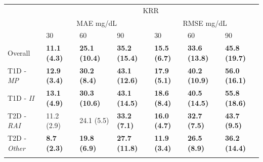 \begin{table}[b!]
\begin{tabular}{lllllll}
			& \multicolumn{6}{c}{KRR}       \\ \cline{2-7}
			\multicolumn{1}{l|}{}                           & \multicolumn{3}{c|}{MAE mg/dL}          & \multicolumn{3}{c|}{RMSE mg/dL} \\ \cline{2-7}
			\multicolumn{1}{l|}{}                           & 30 & 60 & \multicolumn{1}{l|}{90} & 30 & 60 & \multicolumn{1}{l|}{90}  \\ \hline
			\multicolumn{1}{l|}{Overall}                    & {\bf 11.1 (4.3)} & {\bf 25.1 (10.4)} & \multicolumn{1}{l|}{{\bf 35.2 (15.4)}} & {\bf 15.5 (6.7)} & {\bf 33.6 (13.8)} & \multicolumn{1}{l|}{{\bf 45.8 (19.7)}} \\
			\multicolumn{1}{l|}{T1D - {\sl MP}}   & {\bf12.9 (3.4)} & {\bf 30.2 (8.4)} & \multicolumn{1}{l|}{{\bf 43.1 (12.6)}} & {\bf17.9 (5.1)} & {\bf 40.2 (10.9)} & \multicolumn{1}{l|}{{\bf 56.0 (16.1)}}  \\
			\multicolumn{1}{l|}{T1D - {\sl II}}    & {\bf13.1 (4.9)} & {\bf 30.3 (10.6)}  & \multicolumn{1}{l|}{{\bf 43.1 (14.5)}} & {\bf18.6 (8.4)} & {\bf 40.5 (14.5)} & \multicolumn{1}{l|}{{\bf 55.8 (18.6)}}  \\
			\multicolumn{1}{l|}{T2D - {\sl RAI}} & 11.2 (2.9) & 24.1 (5.5) & \multicolumn{1}{l|}{{\bf 33.2 (7.1)}} & {\bf16.0 (4.7)} & {\bf 32.7 (7.5)} & \multicolumn{1}{l|}{{\bf 43.7 (9.5)}}  \\
			\multicolumn{1}{l|}{T2D - {\sl Other}}      & {\bf8.7 (2.3)} & {\bf 19.8 (6.9)} & \multicolumn{1}{l|}{{\bf 27.7 (11.8)}} & {\bf11.9 (3.4)} & {\bf 26.5 (8.9)} & \multicolumn{1}{l|}{{\bf 36.2 (14.4)}}  \\ \hline
			
			\\
			

\end{tabular}
\end{table}
